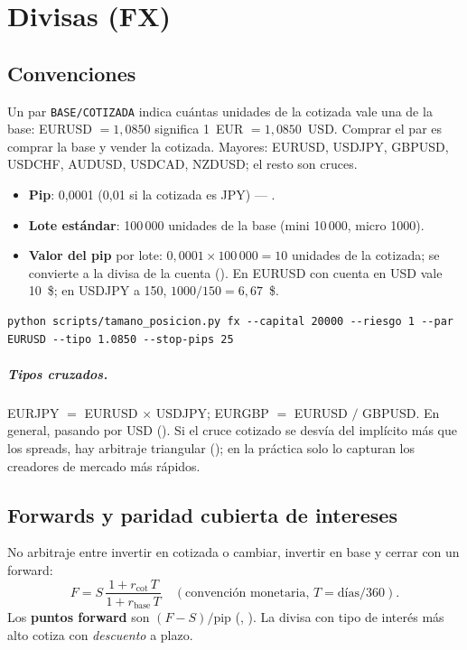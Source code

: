 \chapter{Divisas (FX)}\label{cap:fx}

\section{Convenciones}
Un par \texttt{BASE/COTIZADA} indica cuántas unidades de la cotizada vale una de la base:
EURUSD $=1{,}0850$ significa 1~EUR $=1{,}0850$~USD. Comprar el par es comprar la base y vender la
cotizada. Mayores: EURUSD, USDJPY, GBPUSD, USDCHF, AUDUSD, USDCAD, NZDUSD; el resto son cruces.

\begin{itemize}
\item \textbf{Pip}: 0,0001 (0,01 si la cotizada es JPY) — .
\item \textbf{Lote estándar}: 100\,000 unidades de la base (mini 10\,000, micro 1000).
\item \textbf{Valor del pip} por lote: $0{,}0001\times100\,000=10$ unidades de la cotizada; se convierte
  a la divisa de la cuenta (). En EURUSD con cuenta en USD vale 10~\$; en USDJPY a
  150, $1000/150=6{,}67$~\$.
\end{itemize}

\begin{lstlisting}
python scripts/tamano_posicion.py fx --capital 20000 --riesgo 1 --par EURUSD --tipo 1.0850 --stop-pips 25
\end{lstlisting}

\paragraph{Tipos cruzados.} EURJPY $=$ EURUSD $\times$ USDJPY; EURGBP $=$ EURUSD $/$ GBPUSD. En general,
pasando por USD (). Si el cruce cotizado se desvía del implícito más que los
spreads, hay arbitraje triangular (); en la práctica solo lo capturan los
creadores de mercado más rápidos.

\section{Forwards y paridad cubierta de intereses}
No arbitraje entre invertir en cotizada o cambiar, invertir en base y cerrar con un forward:
\begin{equation}\label{eq:cip}
F = S\,\frac{1+r_{\text{cot}}\,T}{1+r_{\text{base}}\,T}\quad(\text{convención monetaria, } T=\text{días}/360).
\end{equation}
Los \textbf{puntos forward} son $(F-S)/\text{pip}$ (, ). La
divisa con tipo de interés más alto cotiza con \emph{descuento} a plazo.

